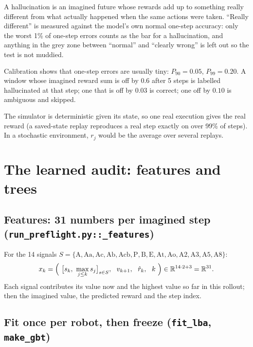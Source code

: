 \documentclass[11pt]{article}
\newcommand{\R}{\mathbb{R}}
\newcommand{\code}[1]{\texttt{#1}}
\begin{document}
\begin{inwords}
A hallucination is an imagined future whose rewards add up to something really different from what actually
happened when the same actions were taken. ``Really different'' is measured against the model's own normal
one-step accuracy: only the worst 1\% of one-step errors counts as the bar for a hallucination, and anything
in the grey zone between ``normal'' and ``clearly wrong'' is left out so the test is not muddied.
\end{inwords}

\begin{example}
Calibration shows that one-step errors are usually tiny: $P_{90}=0.05$, $P_{99}=0.20$. A window whose imagined
reward sum is off by $0.6$ after 5 steps is labelled hallucinated at that step; one that is off by $0.03$ is
correct; one off by $0.10$ is ambiguous and skipped.
\end{example}

The simulator is deterministic given its state, so one real execution gives the real reward (a saved-state replay
reproduces a real step exactly on over 99\% of steps). In a stochastic environment, $r_j$ would be the average over
several replays.

\section{The learned audit: features and trees}\label{sec:features}

\subsection{Features: 31 numbers per imagined step (\code{run\_preflight.py::\_features})}

For the 14 signals $S=\{\text{A},\text{Aa},\text{Ac},\text{Ab},\text{Acb},\text{P},\text{B},\text{E},\text{At},
\text{Ao},\text{A2},\text{A3},\text{A5},\text{A8}\}$:
\[
x_k=\Bigl(\ \bigl[s_k,\ \max_{j\le k}s_j\bigr]_{s\in S},\ \ v_{k+1},\ \ \hat r_k,\ \ k\ \Bigr)\in\R^{14\cdot2+3}=\R^{31}.
\]
Each signal contributes its value now and the highest value so far in this rollout; then the imagined value, the
predicted reward and the step index.

\subsection{Fit once per robot, then freeze (\code{fit\_lba}, \code{make\_gbt})}\label{sec:trees}
\end{document}
